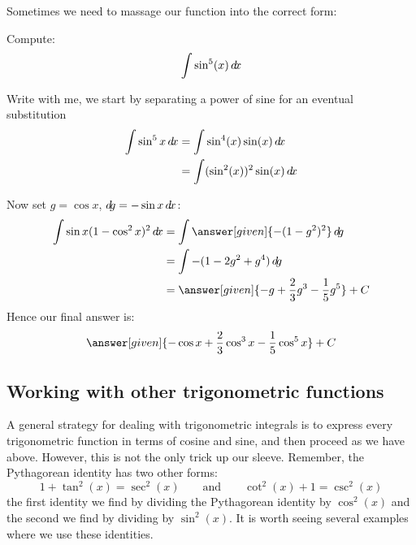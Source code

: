 \documentclass{ximera}
\begin{document}
Sometimes we need to massage our function into the correct form:

\begin{example}
  Compute:
  \[
  \int \sin^5(x) \mathop{}\!d\! x
  \]
  \begin{explanation}
    Write with me, we start by separating a power of sine for an eventual substitution
    \begin{align*}
      \int \sin^5 x\mathop{}\!d\! x &=\int \sin^4(x) \sin(x) \mathop{}\!d\! x\\
      &=\int (\sin^2(x))^2 \sin(x) \mathop{}\!d\! x
    \end{align*}
    \begin{center}%
    \end{center}
    Now set $g=\cos x$, $\mathop{}\!d\! g=-\sin x\mathop{}\!d\! x$:
    \begin{align*}
      \int \sin x (1-\cos^2 x)^2\d x&=\int \answer[given]{-(1-g^2)^2} \d g \\
      &=\int -(1-2g^2+g^4)\d g \\
      &=\answer[given]{-g+\frac{2}{3}g^3-\frac{1}{5}g^5}+C
    \end{align*}
    Hence our final answer is:
    \[
    \answer[given]{-\cos x+\frac{2}{3}\cos^3 x-\frac{1}{5}\cos^5x}+C
    \]
  \end{explanation}
\end{example}


\subsection{Working with other trigonometric functions}

A general strategy for dealing with trigonometric integrals is to
express every trigonometric function in terms of cosine and sine, and
then proceed as we have above. However, this is not the only trick up
our sleeve.  Remember, the Pythagorean identity has two other forms:
\[
1 + \tan^2(x) = \sec^2(x) \qquad\text{and}\qquad \cot^2(x) + 1 = \csc^2(x)
\]
the first identity we find by dividing the Pythagorean identity by
$\cos^2(x)$ and the second we find by dividing by $\sin^2(x)$. It is
worth seeing several examples where we use these identities.
\end{document}

